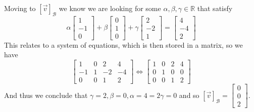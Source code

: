 \documentclass[notoc,notitlepage]{tufte-book}
\newcommand\mat[1]{\begin{bmatrix}#1\end{bmatrix}}
\begin{document}
\begin{enumerate}
\begin{enumerate}
                Moving to $\left[ \vec{v} \right]_{\mathcal{B}}$ we know we are looking for some $\alpha , \beta , \gamma \in \mathbb{R}$ that satisfy
                \begin{equation*}
                    \alpha \mat{ 1 \\ -1 \\ 0 } + \beta \mat{ 0 \\ 1 \\ 0 } + \gamma \mat{ 2 \\ -2 \\ 1 } = \mat{ 4 \\ -4 \\ 2 }
                \end{equation*}
                This relates to a system of equations, which is then stored in a matrix, so we have
                \begin{equation*}
                    \mat{ 1 & 0 & 2 & 4 \\ -1 & 1 & -2 & -4 \\ 0 & 0 & 1 & 2 } \Leftrightarrow \mat{ 1 & 0 & 2 & 4 \\ 0 & 1 & 0 & 0 \\ 0 & 0 & 1 & 2 }
                \end{equation*}
                And thus we conclude that $\gamma = 2 ,\beta = 0, \alpha = 4 = 2 \gamma  = 0$ and so $\left[ \vec{v} \right]_{\mathcal{B}} = \mat{ 0 \\ 0 \\ 2 }$. 


\end{enumerate}
\end{enumerate}
\end{document}
